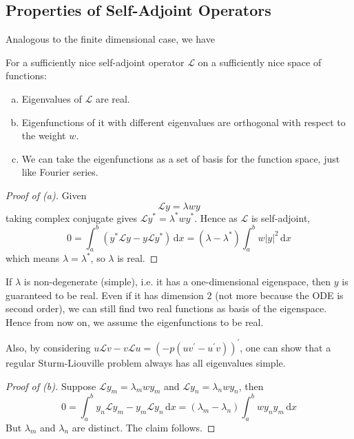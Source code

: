 \documentclass[a4paper]{article}
\begin{document}
\subsection{Properties of Self-Adjoint Operators}
Analogous to the finite dimensional case, we have
\begin{theorem}\label{self-adjoint}
    For a sufficiently nice self-adjoint operator $\mathcal L$ on a sufficiently nice space of functions:
    \begin{enumerate}[(a)]
        \item Eigenvalues of $\mathcal L$ are real.
        \item Eigenfunctions of it with different eigenvalues are orthogonal with respect to the weight $w$.
        \item We can take the eigenfunctions as a set of basis for the function space, just like Fourier series.
    \end{enumerate}
\end{theorem}
\begin{proof}[Proof of (a)]
    Given
    \begin{equation}\label{2.eigenproblem}
        \mathcal Ly=\lambda wy
    \end{equation}
    taking complex conjugate gives $\mathcal Ly^*=\lambda^*wy^*$.
    Hence as $\mathcal L$ is self-adjoint,
    $$0=\int_a^b(y^*\mathcal Ly-y\mathcal Ly^*)\,\mathrm dx=(\lambda-\lambda^*)\int_a^bw|y|^2\,\mathrm dx$$
    which means $\lambda=\lambda^*$, so $\lambda$ is real.
\end{proof}
If $\lambda$ is non-degenerate (simple), i.e. it has a one-dimensional eigenspace, then $y$ is guaranteed to be real.
Even if it has dimension $2$ (not more because the ODE is second order), we can still find two real functions as basis of the eigenspace. Hence from now on, we assume the eigenfunctions to be real.

Also, by considering $u\mathcal Lv-v\mathcal Lu=(-p(uv^\prime-u^\prime v))^\prime$, one can show that a regular Sturm-Liouville problem always has all eigenvalues simple.

\begin{proof}[Proof of (b)]
    Suppose $\mathcal Ly_m=\lambda_mwy_m$ and $\mathcal Ly_n=\lambda_nwy_n$, then
    \begin{equation}\label{2.eq.13}
        0=\int_a^by_n\mathcal Ly_m-y_m\mathcal Ly_n\,\mathrm dx=(\lambda_m-\lambda_n)\int_a^bwy_ny_m\,\mathrm dx
    \end{equation}
    But $\lambda_m$ and $\lambda_n$ are distinct.
    The claim follows.
\end{proof}
\end{document}
